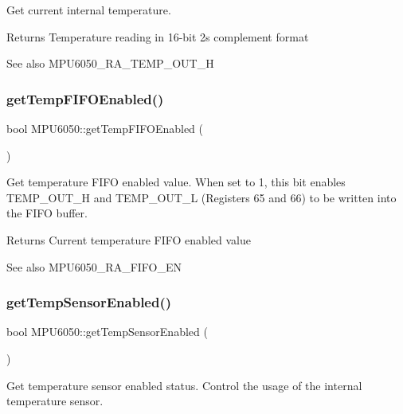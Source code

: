 Get current internal temperature. \begin{DoxyReturn}{Returns}
Temperature reading in 16-\/bit 2\textquotesingle{}s complement format 
\end{DoxyReturn}
\begin{DoxySeeAlso}{See also}
M\+P\+U6050\+\_\+\+R\+A\+\_\+\+T\+E\+M\+P\+\_\+\+O\+U\+T\+\_\+H 
\end{DoxySeeAlso}
\mbox{\label{class_m_p_u6050_a913c2095001e204b5b09f8382a86d2ca}} 
\subsubsection{\texorpdfstring{getTempFIFOEnabled()}{getTempFIFOEnabled()}}
{\footnotesize\ttfamily bool M\+P\+U6050\+::get\+Temp\+F\+I\+F\+O\+Enabled (\begin{DoxyParamCaption}{ }\end{DoxyParamCaption})}

Get temperature F\+I\+FO enabled value. When set to 1, this bit enables T\+E\+M\+P\+\_\+\+O\+U\+T\+\_\+H and T\+E\+M\+P\+\_\+\+O\+U\+T\+\_\+L (Registers 65 and 66) to be written into the F\+I\+FO buffer. \begin{DoxyReturn}{Returns}
Current temperature F\+I\+FO enabled value 
\end{DoxyReturn}
\begin{DoxySeeAlso}{See also}
M\+P\+U6050\+\_\+\+R\+A\+\_\+\+F\+I\+F\+O\+\_\+\+EN 
\end{DoxySeeAlso}
\mbox{\label{class_m_p_u6050_a31f588beab6760258212c65725eba336}} 
\subsubsection{\texorpdfstring{getTempSensorEnabled()}{getTempSensorEnabled()}}
{\footnotesize\ttfamily bool M\+P\+U6050\+::get\+Temp\+Sensor\+Enabled (\begin{DoxyParamCaption}{ }\end{DoxyParamCaption})}

Get temperature sensor enabled status. Control the usage of the internal temperature sensor.

